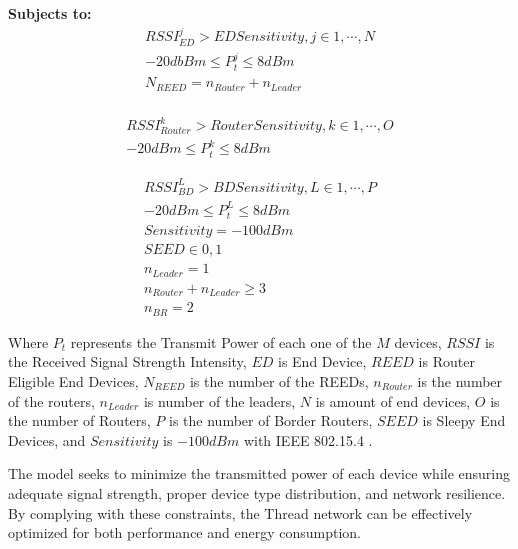     \textbf{Subjects to:}
\begin{equation}\label{eq:mathematical_constraints_end_device}
    \begin{split}
        RSSI_{ED}^j>EDSensitivity,j\in1,\cdots,N \\
        -20dbBm{\le P}_t^j\le8dBm \\
        N_{REED}=n_{Router}+n_{Leader} \\
    \end{split}
\end{equation}

\begin{equation}\label{eq:mathematical_constraints_router}
    \begin{split}
        {RSSI}_{Router}^k>RouterSensitivity,k\in1,\cdots,O \\
        -{20dBm\le P}_t^k\le8dBm
    \end{split}
\end{equation}

\begin{equation}\label{eq:mathematical_constraints_border_router}
    \begin{split}
        {RSSI}_{BD}^L>BDSensitivity,L\in1,\cdots,P \\
        -{20dBm\le P}_t^L\le8dBm \\
        Sensitivity=-100dBm \\
        SEED\in0,1 \\
        n_{Leader}=1 \\
        n_{Router}+n_{Leader}\geq3 \\
        n_{BR}=2
    \end{split}
\end{equation}

    Where $P_t$ represents the Transmit Power of each one of the $M$ devices, $RSSI$ is the Received Signal Strength Intensity, $ED$ is End Device, $REED$ is Router Eligible End Devices, $N_{REED}$ is the number of the REEDs, $n_{Router}$ is the number of the routers, $n_{Leader}$ is number of the leaders, $N$ is amount of end devices, $O$ is the number of Routers, $P$ is the number of Border Routers, $SEED$ is Sleepy End Devices, and $Sensitivity$ is $-100 dBm$ with IEEE 802.15.4 \cite{Semiconductor_Nordic_Product_Brief_2018_2.0}.

\vspace{2mm}
The model seeks to minimize the transmitted power of each device while ensuring adequate signal strength, proper device type distribution, and network resilience. By complying with these constraints, the Thread network can be effectively optimized for both performance and energy consumption.

